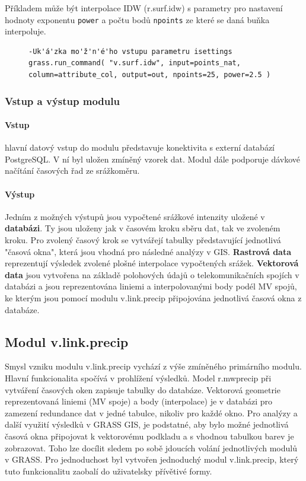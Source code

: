 \documentclass[a4paper,12pt]{report}
\begin{document}
Příkladem může být interpolace IDW (r.surf.idw) s parametry pro nastavení hodnoty exponentu \texttt{power} a počtu bodů \texttt{npoints} ze které se daná buňka interpoluje. 

\begin{figure}[h!]
\begin{footnotesize}
\lstset{extendedchars=false,
escapeinside=''}
\begin{lstlisting}[style=mybash]
-Uk'á'zka mo'ž'n'é'ho vstupu parametru isettings
grass.run_command( "v.surf.idw", input=points_nat,
column=attribute_col, output=out, npoints=25, power=2.5 )                            
\end{lstlisting}
\end{footnotesize} 
\end{figure}


 
\subsubsection{Vstup a výstup modulu}
\paragraph*{Vstup} hlavní datový vstup do modulu představuje konektivita s externí databází PostgreSQL. V ní byl uložen zmíněný vzorek dat.
Modul dále podporuje dávkové načítání časových řad ze srážkoměru.
\paragraph*{Výstup}
Jedním z možných výstupů jsou vypočtené srážkové intenzity uložené v \textbf{databázi}. Ty jsou uloženy jak v časovém kroku sběru dat, tak ve zvoleném kroku. Pro zvolený časový krok se vytvářejí tabulky představující jednotlivá "časová okna", která jsou vhodná pro následné analýzy v GIS.
\textbf{Rastrová data}  reprezentují výsledek zvolené plošné interpolace vypočtených srážek.
\textbf{Vektorová data} jsou vytvořena na základě polohových údajů o telekomunikačních spojích v databázi a jsou reprezentována  liniemi a  interpolovanými body podél MV spojů, ke kterým jsou pomocí modulu v.link.precip připojována jednotlivá časová okna z databáze.



\subsection{Modul v.link.precip}
Smysl vzniku modulu v.link.precip vychází z výše zmíněného primárního modulu. Hlavní funkcionalita spočívá v prohlížení výsledků. Model r.mwprecip při vytváření časových oken zapisuje tabulky do databáze. Vektorová geometrie reprezentovaná liniemi (MV spoje) a body (interpolace)  je v databázi pro zamezení redundance dat v jedné tabulce, nikoliv pro každé okno. Pro analýzy a další využití výsledků v GRASS GIS, je podstatné, aby bylo možné jednotlivá časová okna připojovat k vektorovému podkladu a s vhodnou tabulkou barev je zobrazovat. 
Toho lze docílit sledem po sobě jdoucích volání jednotlivých modulů v GRASS. Pro jednoduchost byl vytvořen jednoduchý modul v.link.precip, který tuto funkcionalitu zaobalí do uživatelsky přívětivé formy. 
\end{document}
